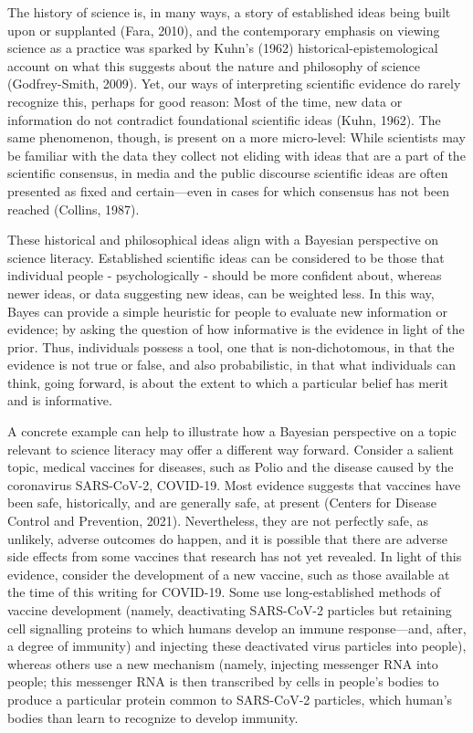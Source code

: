 \documentclass[man]{apa7}
\begin{document}
The history of science is, in many ways, a story of established ideas being built upon or supplanted (Fara, 2010), and the contemporary emphasis on viewing science as a practice was sparked by Kuhn’s (1962) historical-epistemological account on what this suggests about the nature and philosophy of science (Godfrey-Smith, 2009). Yet, our ways of interpreting scientific evidence do rarely recognize this, perhaps for good reason: Most of the time, new data or information do not contradict foundational scientific ideas (Kuhn, 1962). The same phenomenon, though, is present on a more micro-level: While scientists may be familiar with the data they collect not eliding with ideas that are a part of the scientific consensus, in media and the public discourse scientific ideas are often presented as fixed and certain—even in cases for which consensus has not been reached (Collins, 1987).

These historical and philosophical ideas align with a Bayesian perspective on science literacy. Established scientific ideas can be considered to be those that individual people - psychologically - should be more confident about, whereas newer ideas, or data suggesting new ideas, can be weighted less. In this way, Bayes can provide a simple heuristic for people to evaluate new information or evidence; by asking the question of how informative is the evidence in light of the prior. Thus, individuals possess a tool, one that is non-dichotomous, in that the evidence is not true or false, and also probabilistic, in that what individuals can think, going forward, is about the extent to which a particular belief has merit and is informative.

A concrete example can help to illustrate how a Bayesian perspective on a topic relevant to science literacy may offer a different way forward. Consider a salient topic, medical vaccines for diseases, such as Polio and the disease caused by the coronavirus SARS-CoV-2, COVID-19. Most evidence suggests that vaccines have been safe, historically, and are generally safe, at present (Centers for Disease Control and Prevention, 2021). Nevertheless, they are not perfectly safe, as unlikely, adverse outcomes do happen, and it is possible that there are adverse side effects from some vaccines that research has not yet revealed. In light of this evidence, consider the development of a new vaccine, such as those available at the time of this writing for COVID-19. Some use long-established methods of vaccine development (namely, deactivating SARS-CoV-2 particles but retaining cell signalling proteins to which humans develop an immune response—and, after, a degree of immunity) and injecting these deactivated virus particles into people), whereas others use a new mechanism (namely, injecting messenger RNA into people; this messenger RNA is then transcribed by cells in people’s bodies to produce a particular protein common to SARS-CoV-2 particles, which human’s bodies than learn to recognize to develop immunity.
\end{document}

